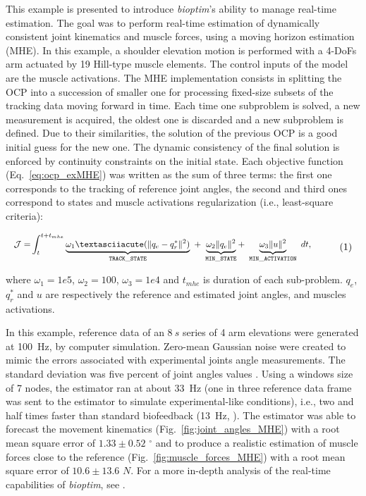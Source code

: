 This example is presented to introduce \textit{bioptim}'s ability to manage real-time estimation.
The goal was to perform real-time estimation of dynamically consistent joint kinematics and muscle forces, using a moving horizon estimation (MHE). 
In this example, a shoulder elevation motion is performed with a 4-DoFs arm actuated by 19 Hill-type muscle elements.
The control inputs of the model are the muscle activations.
The MHE implementation consists in splitting the OCP into a succession of smaller one for processing fixed-size subsets of the tracking data moving forward in time. 
Each time one subproblem is solved, a new measurement is acquired, the oldest one is discarded and a new subproblem is defined. 
Due to their similarities, the solution of the previous OCP is a good initial guess for the new one. 
The dynamic consistency of the final solution is enforced by continuity constraints on the initial state. 
Each objective function (Eq.~\ref{eq:ocp_exMHE}) was written as the sum of three terms: the first one corresponds to the tracking of reference joint angles, the second and third ones correspond to states and muscle activations regularization (i.e., least-square criteria): 

\[ 
\resizebox{0.9\columnwidth}{!}{$ 
\begin{aligned}
\mathcal{J} = &\int_t^{t+t_{mhe}}\underbrace{\omega_1´(\|q_{e} - q^*_{r}\|^{2})}_{\mathtt{TRACK\_STATE}}~ 
+ ~ \underbrace{\omega_2\|q_{e}\|^2}_{\mathtt{MIN\_STATE}} 
+ ~ \underbrace{\omega_3\|u\|^2}_{\mathtt{MIN\_ACTIVATION}}~dt, 
\end{aligned}  
$}  
\addtag  
\label{eq:ocp_exMHE}  
\]  

\noindent where $\omega_1 =1e5$, $\omega_2 = 100$, $\omega_3 = 1e4$ and $t_{mhe}$ is duration of each sub-problem. $q_{e}$, $q^*_{r}$  and $u$ are respectively the reference and estimated joint angles, and muscles activations. 

In this example, reference data of an $8~s$ series of 4 arm elevations were generated at 100~Hz, by computer simulation.
Zero-mean Gaussian noise were created to mimic the errors associated with experimental joints angle measurements.
The standard deviation was five percent of joint angles values \cite{REFestimationerror}.
Using a windows size of 7 nodes, the estimator ran at about 33~Hz (one in three reference data frame was sent to the estimator to simulate experimental-like conditions), i.e., two and half times faster than standard biofeedback (13~Hz, \cite{kannape2013biofeedback}).
The estimator was able to forecast the movement kinematics (Fig.~\ref{fig:joint_angles_MHE}) with a root mean square error of $1.33\pm0.52\text{~}^{\circ}$ and to produce a realistic estimation of muscle forces close to the reference (Fig.~\ref{fig:muscle_forces_MHE}) with a root mean square error of $10.6\pm13.6\text{~}N$. 
For a more in-depth analysis of the real-time capabilities of \textit{bioptim}, see \cite{bailly2020real}.
 

